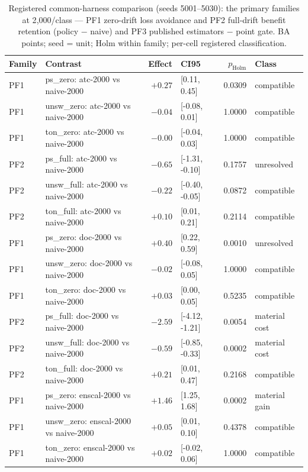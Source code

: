 \begin{table}[t]
\centering
\caption{Registered common-harness comparison (seeds 5001--5030): the primary families at 2{,}000/class --- PF1 zero-drift loss avoidance and PF2 full-drift benefit retention (policy $-$ naive) and PF3 published estimators $-$ point gate. BA points; seed = unit; Holm within family; per-cell registered classification.}
\label{tab:common_harness_supp_primary}
\scriptsize
\setlength{\tabcolsep}{3pt}
\begin{tabular}{l l r l r l}
\toprule
Family & Contrast & Effect & CI95 & $p_{\mathrm{Holm}}$ & Class \\
\midrule
PF1 & ps\_zero: atc-2000 vs naive-2000 & $+0.27$ & [0.11, 0.45] & 0.0309 & compatible \\
PF1 & unsw\_zero: atc-2000 vs naive-2000 & $-0.04$ & [-0.08, 0.01] & 1.0000 & compatible \\
PF1 & ton\_zero: atc-2000 vs naive-2000 & $-0.00$ & [-0.04, 0.03] & 1.0000 & compatible \\
PF2 & ps\_full: atc-2000 vs naive-2000 & $-0.65$ & [-1.31, -0.10] & 0.1757 & unresolved \\
PF2 & unsw\_full: atc-2000 vs naive-2000 & $-0.22$ & [-0.40, -0.05] & 0.0872 & compatible \\
PF2 & ton\_full: atc-2000 vs naive-2000 & $+0.10$ & [0.01, 0.21] & 0.2114 & compatible \\
PF1 & ps\_zero: doc-2000 vs naive-2000 & $+0.40$ & [0.22, 0.59] & 0.0010 & unresolved \\
PF1 & unsw\_zero: doc-2000 vs naive-2000 & $-0.02$ & [-0.08, 0.05] & 1.0000 & compatible \\
PF1 & ton\_zero: doc-2000 vs naive-2000 & $+0.03$ & [0.00, 0.05] & 0.5235 & compatible \\
PF2 & ps\_full: doc-2000 vs naive-2000 & $-2.59$ & [-4.12, -1.21] & 0.0054 & material cost \\
PF2 & unsw\_full: doc-2000 vs naive-2000 & $-0.59$ & [-0.85, -0.33] & 0.0002 & material cost \\
PF2 & ton\_full: doc-2000 vs naive-2000 & $+0.21$ & [0.01, 0.47] & 0.2168 & compatible \\
PF1 & ps\_zero: enscal-2000 vs naive-2000 & $+1.46$ & [1.25, 1.68] & 0.0002 & material gain \\
PF1 & unsw\_zero: enscal-2000 vs naive-2000 & $+0.05$ & [0.01, 0.10] & 0.4378 & compatible \\
PF1 & ton\_zero: enscal-2000 vs naive-2000 & $+0.02$ & [-0.02, 0.06] & 1.0000 & compatible \\

\end{tabular}
\end{table}
